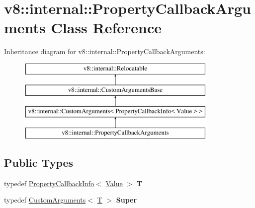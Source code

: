 \hypertarget{classv8_1_1internal_1_1PropertyCallbackArguments}{}\section{v8\+:\+:internal\+:\+:Property\+Callback\+Arguments Class Reference}
\label{classv8_1_1internal_1_1PropertyCallbackArguments}
Inheritance diagram for v8\+:\+:internal\+:\+:Property\+Callback\+Arguments\+:\begin{figure}[H]
\begin{center}
\leavevmode
\includegraphics[height=4.000000cm]{classv8_1_1internal_1_1PropertyCallbackArguments}
\end{center}
\end{figure}
\subsection*{Public Types}
\begin{DoxyCompactItemize}
\item 
\mbox{\label{classv8_1_1internal_1_1PropertyCallbackArguments_a4a81899f78a5d50709980730f670aa48}} 
typedef \mbox{\hyperlink{classv8_1_1PropertyCallbackInfo}{Property\+Callback\+Info}}$<$ \mbox{\hyperlink{classv8_1_1Value}{Value}} $>$ {\bfseries T}
\item 
\mbox{\label{classv8_1_1internal_1_1PropertyCallbackArguments_a80f9d07cc7e4412c0f87aa36c0c6bd35}} 
typedef \mbox{\hyperlink{classv8_1_1internal_1_1CustomArguments}{Custom\+Arguments}}$<$ \mbox{\hyperlink{classv8_1_1PropertyCallbackInfo}{T}} $>$ {\bfseries Super}
\end{DoxyCompactItemize}
